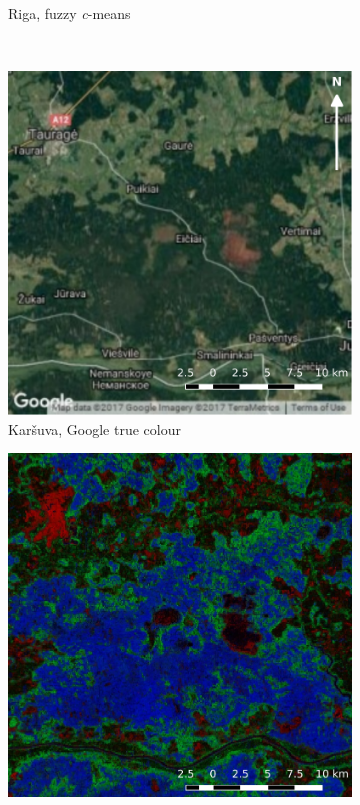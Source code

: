 \documentclass[a4paper,12pt]{scrbook}
\begin{document}
\begin{figure}
\begin{subfigure}[t]{.23\textwidth}
    \caption{Riga, fuzzy \textit{c}-means}
    \label{subfig-riga-cm}
  \end{subfigure} \
  \begin{subfigure}[t]{.23\textwidth}
    \includegraphics[width=\textwidth]{thesis-figures/figures-qgis/karsuva-google}
    \caption{Kar\v{s}uva, Google true colour}
  \end{subfigure} \hfill
  \begin{subfigure}[t]{.23\textwidth}
    \includegraphics[width=\textwidth]{thesis-figures/figures-qgis/karsuva-rf}

\end{subfigure}
\end{figure}
\end{document}
